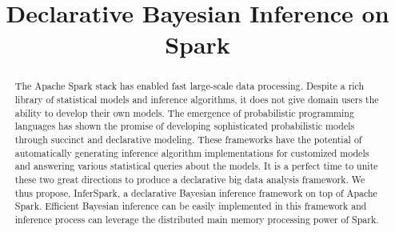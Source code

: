 \documentclass{sig-alternate-05-2015}
\newcommand\Mark[1]{\textsuperscript{#1}}
\begin{document}

\title{Declarative Bayesian Inference on Spark}


\maketitle


\begin{abstract}
The Apache Spark stack has enabled fast
large-scale data processing.
Despite a rich library of statistical models and
inference algorithms, it does not give domain
users the ability to develop their own models.
The emergence of probabilistic programming languages 
has shown the promise of developing sophisticated
probabilistic models through succinct and declarative modeling.
These frameworks have the potential of automatically generating
inference algorithm implementations for customized models and 
answering various statistical queries about the models. 
It is a perfect time to unite these two great directions to
produce a declarative big data analysis framework. 
We thus propose, InferSpark, a declarative Bayesian inference
framework on top of Apache Spark. 
Efficient Bayesian inference can be easily implemented in this 
framework and inference process can leverage the distributed 
main memory processing power of Spark. 
\end{abstract}




%



%


{
\scriptsize


}

\end{document}
